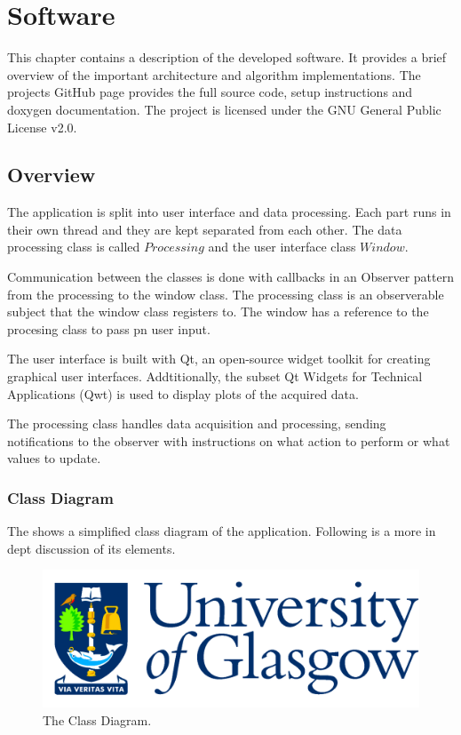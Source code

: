 \chapter[sw]{Software}

This chapter contains a description of the developed software. It provides a brief overview of the important architecture and algorithm implementations. The projects GitHub page provides the full source code, setup instructions and doxygen documentation.\cite{Belinda2020} %
The project is licensed under the GNU General Public License v2.0. 

\section{Overview}
The application is split into user interface and data processing. Each part runs in their own thread and they are kept separated from each other. The data processing class is called $Processing$ and the user interface class $Window$. 

Communication between the classes is done with callbacks in an Observer pattern from the processing to the window class. The processing class is an observerable subject that the window class registers to. The window has a reference to the procesing class to pass pn user input.

The user interface is built with Qt, an open-source widget toolkit for creating graphical user interfaces. Addtitionally, the subset Qt Widgets for Technical Applications (Qwt) is used to display plots of the acquired data. 

The processing class handles data acquisition and processing, sending notifications to the observer with instructions on what action to perform or what values to update. 

\subsection{Class Diagram}
The  shows a simplified class diagram of the application. Following is a more in dept discussion of its elements.

\begin{figure}
\centering
\includegraphics[scale=0.125]{GlaLogo.pdf}
\caption{The Class Diagram.}
\label{fig:CD}
\end{figure}

